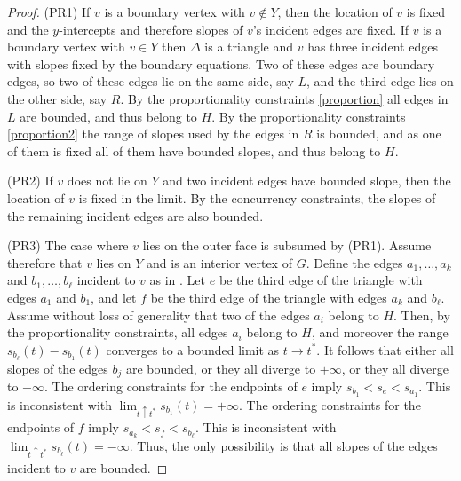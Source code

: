 	\begin{proof}
 (PR1) If $v$ is a boundary vertex with $v\not\in Y$, then
the location of $v$ is fixed and the $y$-intercepts and therefore slopes of
$v$'s incident edges are fixed.  If $v$ is a boundary vertex with $v\in Y$ 
then $\Delta$ is a triangle and $v$ has three incident edges with slopes 
fixed by the boundary equations. Two of these edges are boundary edges, 
so two of these edges lie on the same side, say $L$, and the third edge 
lies on the other side, say $R$. By the proportionality constraints \eqref{proportion}
all edges in $L$ are bounded, and thus belong to $H$. By the 
proportionality constraints \eqref{proportion2} the range of slopes used by the edges in 
$R$ is bounded, and as one of them is fixed all of them have bounded 
slopes, and thus belong to $H$.

		(PR2)	If $v$ does not lie on $Y$ and two incident edges have bounded slope, then the location of $v$ is fixed in the limit.
		By the concurrency constraints, the slopes of the remaining incident
edges are also bounded.

(PR3) The case where $v$ lies on the outer face is subsumed by (PR1).
Assume therefore that $v$ lies on $Y$ and is an interior vertex of $G$.  Define the edges $a_1,\ldots,a_k$
		and $b_1,\ldots,b_\ell$ incident to $v$ as in .  Let $e$ be the third edge of the triangle with edges $a_1$ and $b_1$, and let
		$f$ be the third edge of the triangle with edges $a_k$ and $b_\ell$.
		Assume without loss of generality that two of the edges $a_i$ belong to $H$. Then, by the proportionality constraints, all edges $a_i$ belong to $H$, and moreover the range $s_{b_\ell}(t)-s_{b_1}(t)$ converges to a bounded limit as $t\to t^*$.  It follows that either all slopes of the edges $b_j$ are bounded, or they all diverge to $+\infty$,
		or they all diverge to $-\infty$. The ordering constraints for the
		endpoints of $e$ imply \begin{math}
		s_{b_1}<s_e<s_{a_1}
		\end{math}.
		This is inconsistent with $\lim_{t\uparrow t^*} s_{b_1}(t)=+\infty$.
		The ordering constraints for the endpoints of $f$ imply
		\begin{math}
		s_{a_k}<s_f<s_{b_\ell}
		\end{math}.
		This is inconsistent with $\lim_{t\uparrow t^*} s_{b_\ell}(t)=-\infty$. Thus, the only
		possibility is that all slopes of the edges incident to $v$ are bounded.
		

\end{proof}
